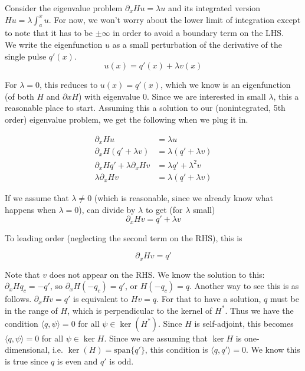 \documentclass[12pt]{article}
\begin{document}
Consider the eigenvalue problem $\partial_x H u = \lambda u$ and its integrated version $Hu = \lambda \int_a^x u$. For now, we won't worry about the lower limit of integration except to note that it has to be $\pm \infty$ in order to avoid a boundary term on the LHS.\\

We write the eigenfunction $u$ as a small perturbation of the derivative of the single pulse $q'(x)$.
\[
u(x) = q'(x) + \lambda v(x)
\]

For $\lambda = 0$, this reduces to $u(x) = q'(x)$, which we know is an eigenfunction (of both $H$ and $\partial x H$) with eigenvalue 0. Since we are interested in small $\lambda$, this a reasonable place to start. Assuming this a solution to our (nonintegrated, 5th order) eigenvalue problem, we get the following when we plug it in.

\begin{align*}
\partial_x H u &= \lambda u \\
\partial_x H (q' + \lambda v) &= \lambda(q' + \lambda v) \\
\partial_x H q' + \lambda \partial_x H v &= \lambda q' + \lambda^2 v \\
\lambda \partial_x H v &= \lambda(q' + \lambda v)
\end{align*}

If we assume that $\lambda \neq 0$ (which is reasonable, since we already know what happens when $\lambda = 0$), can divide by $\lambda$ to get (for $\lambda$ small)
\[
\partial_x H v = q' + \lambda v
\]

To leading order (neglecting the second term on the RHS), this is

\[
\partial_x H v = q'
\]

Note that $v$ does not appear on the RHS. We know the solution to this: $\partial_x H q_c = -q'$, so $\partial_x H (-q_c) = q'$, or $H (-q_c) = q$. Another way to see this is as follows. $\partial_x H v = q'$ is equivalent to $Hv = q$. For that to have a solution, $q$ must be in the range of $H$, which is perpendicular to the kernel of $H^*$. Thus we have the condition $\langle q, \psi \rangle = 0$ for all $\psi \in \ker(H^*)$. Since $H$ is self-adjoint, this becomes $\langle q, \psi \rangle = 0$ for all $\psi \in \ker H$. Since we are assuming that $\ker H$ is one-dimensional, i.e. $\ker(H) = \textrm{span} \{q'\}$, this condition is $\langle q, q' \rangle = 0$. We know this is true since $q$ is even and $q'$ is odd.\\
\end{document}
